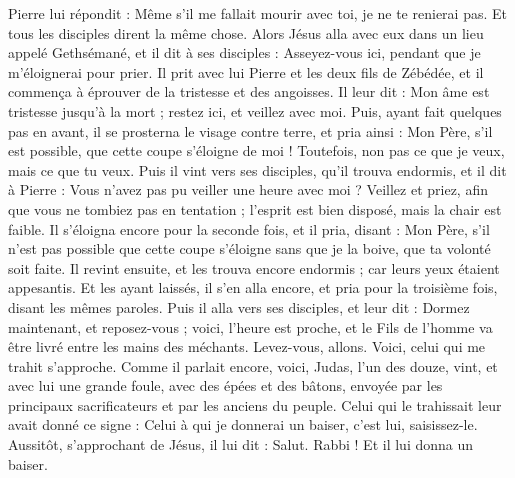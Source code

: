 \begin{multicols}{2}
Pierre lui répondit : Même s’il me fallait mourir avec toi, je ne te renierai pas. Et tous les disciples dirent la même chose.
Alors Jésus alla avec eux dans un lieu appelé Gethsémané, et il dit à ses disciples : Asseyez-vous ici, pendant que je m’éloignerai pour prier.
Il prit avec lui Pierre et les deux fils de Zébédée, et il commença à éprouver de la tristesse et des angoisses.
Il leur dit : Mon âme est tristesse jusqu’à la mort ; restez ici, et veillez avec moi.
Puis, ayant fait quelques pas en avant, il se prosterna le visage contre terre, et pria ainsi : Mon Père, s'il est possible, que cette coupe s’éloigne de moi ! Toutefois, non pas ce que je veux, mais ce que tu veux.
Puis il vint vers ses disciples, qu’il trouva endormis, et il dit à Pierre : Vous n’avez pas pu veiller une heure avec moi ?
Veillez et priez, afin que vous ne tombiez pas en tentation ; l'esprit est bien disposé, mais la chair est faible.
Il s’éloigna encore pour la seconde fois, et il pria, disant : Mon Père, s'il n'est pas possible que cette coupe s’éloigne sans que je la boive, que ta volonté soit faite.
Il revint ensuite, et les trouva encore endormis ; car leurs yeux étaient appesantis.
Et les ayant laissés, il s'en alla encore, et pria pour la troisième fois, disant les mêmes paroles.
Puis il alla vers ses disciples, et leur dit : Dormez maintenant, et reposez-vous ; voici, l'heure est proche, et le Fils de l'homme va être livré entre les mains des méchants.
Levez-vous, allons. Voici, celui qui me trahit s'approche.
Comme il parlait encore, voici, Judas, l'un des douze, vint, et avec lui une grande foule, avec des épées et des bâtons, envoyée par les principaux sacrificateurs et par les anciens du peuple.
Celui qui le trahissait leur avait donné ce signe : Celui à qui je donnerai un baiser, c'est lui, saisissez-le.
Aussitôt, s'approchant de Jésus, il lui dit : Salut. Rabbi ! Et il lui donna un baiser.

\end{multicols}
